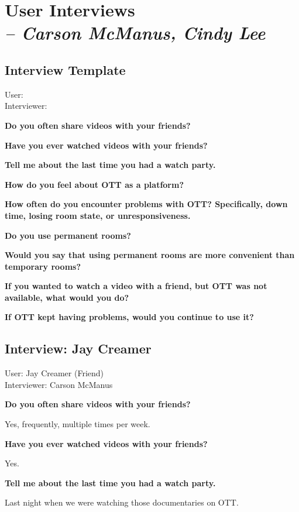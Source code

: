 \chapter{User Interviews \\
  \small{\textit{-- Carson McManus, Cindy Lee}}
  \label{Chapter::UserInterviews}}


\section{Interview Template}

User: \\
Interviewer:

\textbf{Do you often share videos with your friends?}

\textbf{Have you ever watched videos with your friends?}

\textbf{Tell me about the last time you had a watch party.}

\textbf{How do you feel about OTT as a platform?}

\textbf{How often do you encounter problems with OTT? Specifically, down time, losing room state, or unresponsiveness.}

\textbf{Do you use permanent rooms?}

\textbf{Would you say that using permanent rooms are more convenient than temporary rooms?}

\textbf{If you wanted to watch a video with a friend, but OTT was not available, what would you do?}

\textbf{If OTT kept having problems, would you continue to use it?}


\section{Interview: Jay Creamer}

User: Jay Creamer (Friend)\\
Interviewer: Carson McManus

\textbf{Do you often share videos with your friends?}

Yes, frequently, multiple times per week.

\textbf{Have you ever watched videos with your friends?}

Yes.

\textbf{Tell me about the last time you had a watch party.}

Last night when we were watching those documentaries on OTT.

